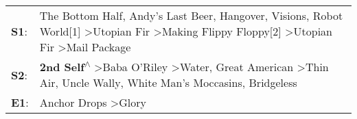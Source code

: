 \begin{supertabular}{p{0.03\textwidth}p{0.92\textwidth}}
 \textbf{S1}:  &  The Bottom Half\textsuperscript{}, \enspace Andy's Last Beer\textsuperscript{}, \enspace Hangover\textsuperscript{}, \enspace Visions\textsuperscript{}, \enspace Robot World[1]\textsuperscript{} \textgreater \enspace Utopian Fir\textsuperscript{} \textgreater \enspace Making Flippy Floppy[2]\textsuperscript{} \textgreater \enspace Utopian Fir\textsuperscript{} \textgreater \enspace Mail Package\textsuperscript{}  \enspace  \\
 \textbf{S2}:  &                                                      \textbf{2nd Self\textsuperscript{$\wedge$}} \textgreater \enspace Baba O'Riley\textsuperscript{} \textgreater \enspace Water\textsuperscript{}, \enspace Great American\textsuperscript{} \textgreater \enspace Thin Air\textsuperscript{}, \enspace Uncle Wally\textsuperscript{}, \enspace White Man's Moccasins\textsuperscript{}, \enspace Bridgeless\textsuperscript{}  \enspace  \\
 \textbf{E1}:  &                                                                                                                                                                                                                                                                                                                                                     Anchor Drops\textsuperscript{} \textgreater \enspace Glory\textsuperscript{}  \enspace  \\
\end{supertabular}
